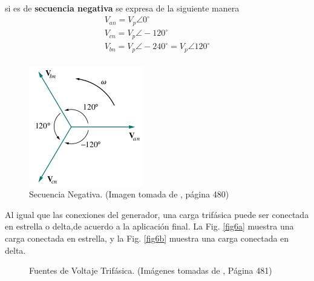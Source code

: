 \documentclass[twocolumn]{IEEEtran}
\begin{document}
\noindent
si es de \textbf{secuencia negativa} se expresa de la siguiente manera
\begin{equation}
 \begin{array}{l}
 {V_{an}} = {V_p}\angle 0^\circ  \\ 
 {V_{cn}} = {V_p}\angle  - 120^\circ  \\ 
 {V_{bn}} = {V_p}\angle  - 240^\circ  = {V_p}\angle 120^\circ  \\ 
 \end{array}
\label{ecu4}
\end{equation}
\begin{figure}[H]
	\centering
		\includegraphics[scale=0.75]{negativa.png}
	\caption{Secuencia Negativa. (Imagen tomada de \cite{sadiku}, página 480)}
	\label{fig5}
\end{figure}
\noindent
Al igual que las conexiones del generador, una carga trifásica puede ser conectada en estrella o delta,de acuerdo a la aplicación final. La Fig. \ref{fig6a} muestra una carga conectada en estrella, y la Fig. \ref{fig6b} muestra una carga conectada en delta.
\begin{figure}[H]
  \centering
  \hspace{2cm}
  \caption{Fuentes de Voltaje Trifásica. (Imágenes tomadas de \cite{sadiku}, Página 481)}
    \label{fig6}
\end{figure}
\end{document}

